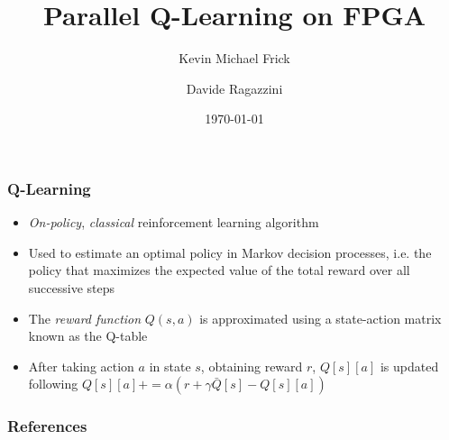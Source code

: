 \documentclass{beamer}
\begin{document}
\title{Parallel Q-Learning on FPGA}
\author{Kevin Michael Frick \and Davide Ragazzini}
\date{\today}
\begin{frame}
	\titlepage
\end{frame}

\begin{frame}
	\frametitle{Q-Learning}
	\begin{itemize}
		\item \emph{On-policy}, \emph{classical} reinforcement learning algorithm
	\item Used to estimate an optimal policy in Markov decision processes, i.e. the policy that maximizes the expected value of the total reward over all successive steps
	\item The \emph{reward function} $Q(s, a)$ is approximated using a state-action matrix known as the Q-table
	\item After taking action $a$ in state $s$, obtaining reward $r$, $Q[s][a]$ is updated following $Q[s][a] += \alpha  (r + \gamma  \bar{Q}[s] - Q[s][a])$
	\end{itemize}
	{
	
	\centering



	}
\end{frame}

\begin{frame}[allowframebreaks]
	\frametitle{References}
	
	\nocite{*}
	
\end{frame}
\end{document}
